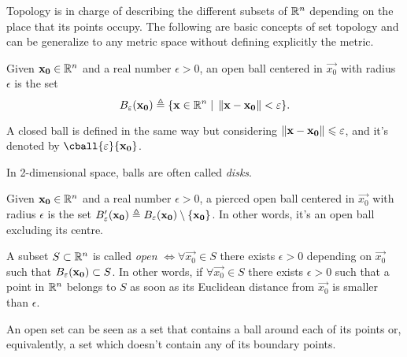 Topology is in charge of describing the different subsets of $\Rtn$ depending on the place that its points occupy. The
following are basic concepts of set topology and can be generalize to any metric space without defining explicitly the metric.

\begin{defn}
Given $\vec{x_0}\in\Rtn$ and a real number $\epsilon > 0$, an open ball centered in $\vec{x_0}$ with radius $\epsilon$ is the set
\begin{equation}
B_\epsilon\argopen(\vec{x_0}\argclose)\bydef\{\vec{x}\in\Rtn\st\vnorm{\vec{x} - \vec{x_0}} < \epsilon\}.
\end{equation}
\end{defn}

\begin{remark}
    A closed ball is defined in the same way but considering $\left\Vert \mathbf{x} - \mathbf{x_0} \right\Vert\leqslant\varepsilon$, and it's denoted 
    by $\cball{\epsilon}{\vec{x_0}}$.
\end{remark}

\begin{note}
	In 2-dimensional space, balls are often called \textit{disks}.
\end{note}

\begin{defn}
Given $\vec{x_0}\in\Rtn$ and a real number $\epsilon > 0$, a pierced open ball centered in $\vec{x_0}$ with radius $\epsilon$ is the
set $B'_\epsilon\argopen(\vec{x_0}\argclose)\bydef B_\epsilon\argopen(\vec{x_0}\argclose)\setminus\{\vec{x_0}\}$. In other words, it's an 
open ball excluding its centre.
\end{defn}

\begin{defn}
	A subset $S\subset\Rtn$ is called \textit{open} $\iff\forall\vec{x_0}\in S$ there exists $\epsilon > 0$ depending on $\vec{x_0}$ such that $B_\epsilon\argopen(\vec{x_0}\argclose)\subset S$. In other words, if $\forall\vec{x_0}\in S$ there exists $\epsilon > 0$
	such that a point in $\Rtn$ belongs to $S$ as soon as its Euclidean distance from $\vec{x_0}$ is smaller than $\epsilon$. 
\end{defn}

\begin{note}
An open set can be seen as a set that contains a ball around each of its points or, equivalently, a set which doesn't contain any of
its boundary points.
\end{note}

